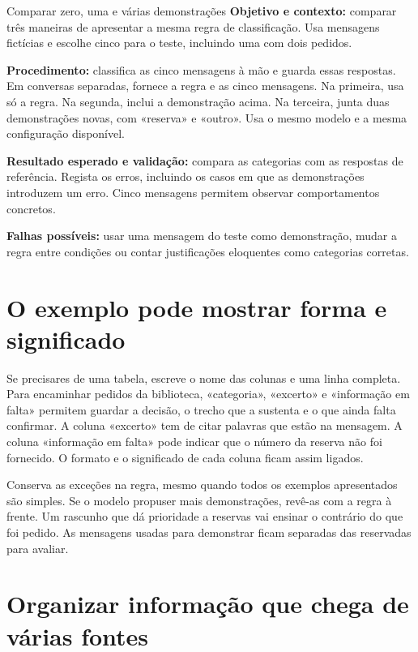 \begin{promptlabbox}{Comparar zero, uma e várias demonstrações}
\textbf{Objetivo e contexto:} comparar três maneiras de apresentar a mesma regra de classificação. Usa mensagens fictícias e escolhe cinco para o teste, incluindo uma com dois pedidos.

\textbf{Procedimento:} classifica as cinco mensagens à mão e guarda essas respostas. Em conversas separadas, fornece a regra e as cinco mensagens. Na primeira, usa só a regra. Na segunda, inclui a demonstração acima. Na terceira, junta duas demonstrações novas, com «reserva» e «outro». Usa o mesmo modelo e a mesma configuração disponível.

\textbf{Resultado esperado e validação:} compara as categorias com as respostas de referência. Regista os erros, incluindo os casos em que as demonstrações introduzem um erro. Cinco mensagens permitem observar comportamentos concretos.

\textbf{Falhas possíveis:} usar uma mensagem do teste como demonstração, mudar a regra entre condições ou contar justificações eloquentes como categorias corretas.
\end{promptlabbox}

\section{O exemplo pode mostrar forma e significado}

Se precisares de uma tabela, escreve o nome das colunas e uma linha completa. Para encaminhar pedidos da biblioteca, «categoria», «excerto» e «informação em falta» permitem guardar a decisão, o trecho que a sustenta e o que ainda falta confirmar. A coluna «excerto» tem de citar palavras que estão na mensagem. A coluna «informação em falta» pode indicar que o número da reserva não foi fornecido. O formato e o significado de cada coluna ficam assim ligados.

Conserva as exceções na regra, mesmo quando todos os exemplos apresentados são simples. Se o modelo propuser mais demonstrações, revê-as com a regra à frente. Um rascunho que dá prioridade a reservas vai ensinar o contrário do que foi pedido. As mensagens usadas para demonstrar ficam separadas das reservadas para avaliar.

\section{Organizar informação que chega de várias fontes}

